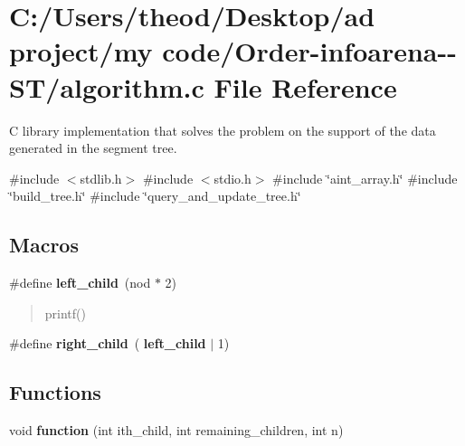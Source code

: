 \section{C\+:/\+Users/theod/\+Desktop/ad project/my code/\+Order-\/infoarena-\/-\/\+S\+T/algorithm.c File Reference}
\label{algorithm_8c}


C library implementation that solves the problem on the support of the data generated in the segment tree.  


{\ttfamily \#include $<$stdlib.\+h$>$}\newline
{\ttfamily \#include $<$stdio.\+h$>$}\newline
{\ttfamily \#include \char`\"{}aint\+\_\+array.\+h\char`\"{}}\newline
{\ttfamily \#include \char`\"{}build\+\_\+tree.\+h\char`\"{}}\newline
{\ttfamily \#include \char`\"{}query\+\_\+and\+\_\+update\+\_\+tree.\+h\char`\"{}}\newline
\subsection*{Macros}
\begin{DoxyCompactItemize}
\item 
\mbox{\label{algorithm_8c_adc8ab280883a50ebb40e365db3a45f66}} 
\#define \textbf{ left\+\_\+child}~(nod $\ast$ 2)
\begin{DoxyCompactList}\small\item\em \begin{quote}
printf() \end{quote}
\end{DoxyCompactList}\item 
\mbox{\label{algorithm_8c_a1a536bb5eb7c78383ef9ccdf18a20e8c}} 
\#define {\bfseries right\+\_\+child}~(\textbf{ left\+\_\+child} $\vert$ 1)
\end{DoxyCompactItemize}
\subsection*{Functions}
\begin{DoxyCompactItemize}
\item 
void \textbf{ function} (int ith\+\_\+child, int remaining\+\_\+children, int n)
\end{DoxyCompactItemize}


